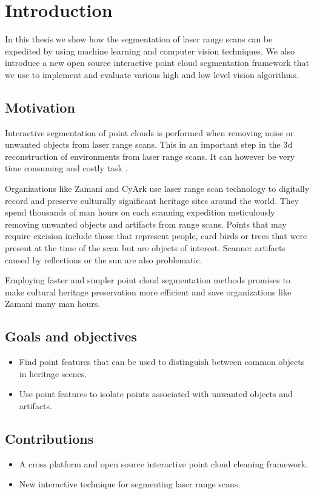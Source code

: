\chapter{Introduction}

In this thesis we show how the segmentation of laser range scans can be expedited by using machine learning and computer vision techniques. We also introduce a new open source interactive point cloud segmentation framework that we use to implement and evaluate various high and low level vision algorithms.

\section{Motivation}
Interactive segmentation of point clouds is performed when removing noise or unwanted objects from laser range scans. This in an important step in the 3d reconstruction of environments from laser range scans. It can however be very time consuming and costly task \cite{Ruther2011}.

Organizations like Zamani and CyArk use laser range scan technology to digitally record and preserve culturally significant heritage sites around the world. They spend thousands of man hours on each scanning expedition meticulously removing unwanted objects and artifacts from range scans. Points that may require excision include those that represent people, card birds or trees that were present at the time of the scan but are objects of interest. Scanner artifacts caused by reflections or the sun are also problematic.

Employing faster and simpler point cloud segmentation methods promises to make cultural heritage preservation more efficient and save organizations like Zamani many man hours.

\section{Goals and objectives}
\begin{itemize}
\item Find point features that can be used to distinguish between common objects in heritage scenes.
\item Use point features to isolate points associated with unwanted objects and artifacts.
\end{itemize}

\section{Contributions}
\begin{itemize}
\item A cross platform and open source interactive point cloud cleaning framework.
\item New interactive technique for segmenting laser range scans.
\end{itemize}

